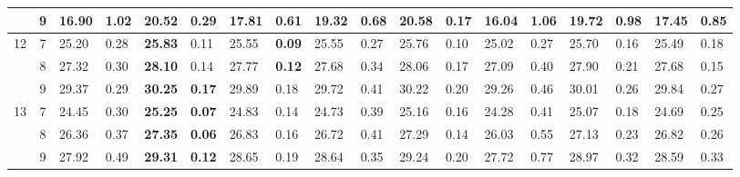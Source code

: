 \documentclass[conference]{IEEEtran}
\begin{document}
\begin{table*}[]
\begin{tabular}{|cc|ll|ll|ll|ll|ll|ll|ll|ll|}
		\multicolumn{1}{|c|}{} & 9 & \multicolumn{1}{l|}{16.90} & 1.02 & \multicolumn{1}{l|}{20.52} & 0.29 & \multicolumn{1}{l|}{17.81} & 0.61 & \multicolumn{1}{l|}{19.32} & 0.68 & \multicolumn{1}{l|}{\textbf{20.58}} & \textbf{0.17} & \multicolumn{1}{l|}{16.04} & 1.06 & \multicolumn{1}{l|}{19.72} & 0.98 & \multicolumn{1}{l|}{17.45} & 0.85 \\ \hline
		\multicolumn{1}{|c|}{\multirow{3}{*}{12}} & 7 & \multicolumn{1}{l|}{25.20} & 0.28 & \multicolumn{1}{l|}{\textbf{25.83}} & 0.11 & \multicolumn{1}{l|}{25.55} & \textbf{0.09} & \multicolumn{1}{l|}{25.55} & 0.27 & \multicolumn{1}{l|}{25.76} & 0.10 & \multicolumn{1}{l|}{25.02} & 0.27 & \multicolumn{1}{l|}{25.70} & 0.16 & \multicolumn{1}{l|}{25.49} & 0.18 \\ \cline{2-18} 
		\multicolumn{1}{|c|}{} & 8 & \multicolumn{1}{l|}{27.32} & 0.30 & \multicolumn{1}{l|}{\textbf{28.10}} & 0.14 & \multicolumn{1}{l|}{27.77} & \textbf{0.12} & \multicolumn{1}{l|}{27.68} & 0.34 & \multicolumn{1}{l|}{28.06} & 0.17 & \multicolumn{1}{l|}{27.09} & 0.40 & \multicolumn{1}{l|}{27.90} & 0.21 & \multicolumn{1}{l|}{27.68} & 0.15 \\ \cline{2-18} 
		\multicolumn{1}{|c|}{} & 9 & \multicolumn{1}{l|}{29.37} & 0.29 & \multicolumn{1}{l|}{\textbf{30.25}} & \textbf{0.17} & \multicolumn{1}{l|}{29.89} & 0.18 & \multicolumn{1}{l|}{29.72} & 0.41 & \multicolumn{1}{l|}{30.22} & 0.20 & \multicolumn{1}{l|}{29.26} & 0.46 & \multicolumn{1}{l|}{30.01} & 0.26 & \multicolumn{1}{l|}{29.84} & 0.27 \\ \hline
		\multicolumn{1}{|c|}{\multirow{3}{*}{13}} & 7 & \multicolumn{1}{l|}{24.45} & 0.30 & \multicolumn{1}{l|}{\textbf{25.25}} & \textbf{0.07} & \multicolumn{1}{l|}{24.83} & 0.14 & \multicolumn{1}{l|}{24.73} & 0.39 & \multicolumn{1}{l|}{25.16} & 0.16 & \multicolumn{1}{l|}{24.28} & 0.41 & \multicolumn{1}{l|}{25.07} & 0.18 & \multicolumn{1}{l|}{24.69} & 0.25 \\ \cline{2-18} 
		\multicolumn{1}{|c|}{} & 8 & \multicolumn{1}{l|}{26.36} & 0.37 & \multicolumn{1}{l|}{\textbf{27.35}} & \textbf{0.06} & \multicolumn{1}{l|}{26.83} & 0.16 & \multicolumn{1}{l|}{26.72} & 0.41 & \multicolumn{1}{l|}{27.29} & 0.14 & \multicolumn{1}{l|}{26.03} & 0.55 & \multicolumn{1}{l|}{27.13} & 0.23 & \multicolumn{1}{l|}{26.82} & 0.26 \\ \cline{2-18} 
		\multicolumn{1}{|c|}{} & 9 & \multicolumn{1}{l|}{27.92} & 0.49 & \multicolumn{1}{l|}{\textbf{29.31}} & \textbf{0.12} & \multicolumn{1}{l|}{28.65} & 0.19 & \multicolumn{1}{l|}{28.64} & 0.35 & \multicolumn{1}{l|}{29.24} & 0.20 & \multicolumn{1}{l|}{27.72} & 0.77 & \multicolumn{1}{l|}{28.97} & 0.32 & \multicolumn{1}{l|}{28.59} & 0.33 \\ \hline

\end{tabular}
\end{table*}
\end{document}
